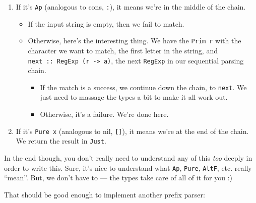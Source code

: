 \documentclass[]{article}
\begin{document}
\begin{enumerate}
\def\labelenumi{\arabic{enumi}.}
\item
  If it's \texttt{Ap} (analogous to cons, \texttt{:}), it means we're in the
  middle of the chain.

  \begin{itemize}
  \tightlist
  \item
    If the input string is empty, then we fail to match.
  \item
    Otherwise, here's the interesting thing. We have the \texttt{Prim\ r} with
    the character we want to match, the first letter in the string, and
    \texttt{next\ ::\ RegExp\ (r\ -\textgreater{}\ a)}, the next \texttt{RegExp}
    in our sequential parsing chain.

    \begin{itemize}
    \tightlist
    \item
      If the match is a success, we continue down the chain, to \texttt{next}.
      We just need to massage the types a bit to make it all work out.
    \item
      Otherwise, it's a failure. We're done here.
    \end{itemize}
  \end{itemize}
\item
  If it's \texttt{Pure\ x} (analogous to nil, \texttt{{[}{]}}), it means we're
  at the end of the chain. We return the result in \texttt{Just}.
\end{enumerate}

In the end though, you don't really need to understand any of this \emph{too}
deeply in order to write this. Sure, it's nice to understand what \texttt{Ap},
\texttt{Pure}, \texttt{AltF}, etc. really ``mean''. But, we don't have to ---
the types take care of all of it for you :)

That should be good enough to implement another prefix parser:
\end{document}
